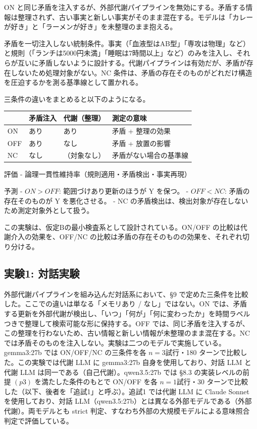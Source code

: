 \documentclass[12pt,a4paper]{article}
\begin{document}
\begin{definition}
ON と同じ矛盾を注入するが、外部代謝パイプラインを無効にする。矛盾する情報は整理されず、古い事実と新しい事実がそのまま混在する。モデルは「カレーが好き」と「ラーメンが好き」を未整理のまま抱える。
\end{definition}

\begin{definition}
矛盾を一切注入しない統制条件。事実（「血液型はAB型」「専攻は物理」など）と規則（「ランチは5000円未満」「睡眠は7時間以上」など）のみを注入し、それらが互いに矛盾しないように設計する。代謝パイプラインは有効だが、矛盾が存在しないため処理対象がない。NC 条件は、矛盾の存在そのものがどれだけ構造を圧迫するかを測る基準線として置かれる。
\end{definition}

三条件の違いをまとめると以下のようになる。

{\def\LTcaptype{table} %
\begin{longtable}[]{@{}llll@{}}
\toprule\noalign{}
& 矛盾注入 & 代謝（整理） & 測定の意味 \\
\midrule\noalign{}
\endhead
\bottomrule\noalign{}
\endlastfoot
ON & あり & あり & 矛盾 + 整理の効果 \\
OFF & あり & なし & 矛盾 + 放置の影響 \\
NC & なし & （対象なし） & 矛盾がない場合の基準線 \\
\end{longtable}
}

評価 - 論理一貫性維持率（規則適用・矛盾検出・事実再現）

予測 - \(ON > OFF\): 範囲づけあり更新のほうが Y を保つ。 - \(OFF < NC\): 矛盾の存在そのものが Y を悪化させる。 - NC の矛盾検出は、検出対象が存在しないため測定対象外として扱う。

この実験は、仮定Bの最小検査系として設計されている。ON/OFF の比較は代謝介入の効果を、OFF/NC の比較は矛盾の存在そのものの効果を、それぞれ切り分ける。

\subsection{実験1: 対話実験}\label{ux5b9fux9a131-ux5bfeux8a71ux5b9fux9a13}

外部代謝パイプラインを組み込んだ対話系において、§9 で定めた三条件を比較した。ここでの違いは単なる「メモリあり / なし」ではない。ON では、矛盾する更新を外部代謝が検出し、「いつ」「何が」「何に変わったか」を時間ラベルつきで整理して検索可能な形に保持する。OFF では、同じ矛盾を注入するが、この整理を行わないため、古い情報と新しい情報が未整理のまま混在する。NC では矛盾そのものを注入しない。実験は二つのモデルで実施している。gemma3:27b では ON/OFF/NC の三条件を各 \(n=3\)試行・180 ターンで比較した。この実験では代謝 LLM に gemma3:27b 自身を使用しており、対話 LLM と代謝 LLM は同一である（自己代謝）。qwen3.5:27b では §8.3 の実装レベルの前提 \((p3)\) を満たした条件のもとで ON/OFF を各 \(n=1\)試行・30 ターンで比較した（以下、後者を「追試1」と呼ぶ）。追試1 では代謝 LLM に Claude Sonnet を使用しており、対話 LLM（qwen3.5:27b）とは異なる外部モデルである（外部代謝）。両モデルとも strict 判定、すなわち外部の大規模モデルによる意味照合判定で評価している。
\end{document}
